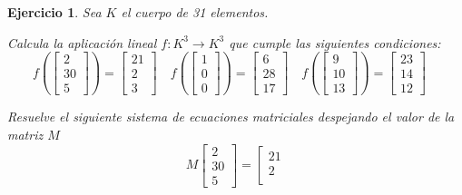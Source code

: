 \documentclass[12pt]{amsart}
\newtheorem{ejer}{Ejercicio}
\begin{document}
\begin{ejer} Sea $K$ el cuerpo de 31 elementos.
\newline
\noindent\begin{minipage}{\textwidth}
\begin{tcolorbox}[colback = green!20!white,title=Versión Aplicación]
Calcula la aplicaci\'on lineal $f:K^{3} \to K^{3}$ que cumple las siguientes condiciones: 
\[f\left(\left[\begin{array}{r}
2 \\
30 \\
5
\end{array}\right]\right) = \left[\begin{array}{r}
21 \\
2 \\
3
\end{array}\right] \quad f\left(\left[\begin{array}{r}
1 \\
0 \\
0
\end{array}\right]\right) = \left[\begin{array}{r}
6 \\
28 \\
17
\end{array}\right] \quad f\left(\left[\begin{array}{r}
9 \\
10 \\
13
\end{array}\right]\right) = \left[\begin{array}{r}
23 \\
14 \\
12
\end{array}\right] \quad 
\]\end{tcolorbox}
\end{minipage} \newline
\noindent\begin{minipage}{\textwidth}
\begin{tcolorbox}[colback = blue!20!white,title=Versión Sistema Matricial]
Resuelve el siguiente sistema de ecuaciones matriciales despejando el valor de la matriz $M$
\[M \left[\begin{array}{r}
2 \\
30 \\
5
\end{array}\right] = \left[\begin{array}{r}
21 \\
2 \\

\end{array}\]
\end{tcolorbox}
\end{minipage}
\end{ejer}
\end{document}
